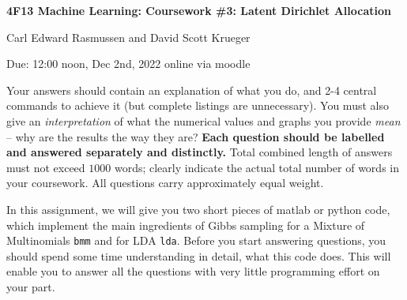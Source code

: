 \documentclass[11pt]{article}
\begin{document}
\centerline{\large\bf 4F13 Machine Learning: Coursework \#3: Latent
  Dirichlet Allocation}

\vspace{0.3cm}

\centerline{Carl Edward Rasmussen and David Scott Krueger} 

\vspace{0.2cm}

\centerline{Due: 12:00 noon, Dec 2nd, 2022 online via moodle}

\vspace{2mm}

Your answers should contain an explanation of what you do, and 2-4
central commands to achieve it (but complete listings are
unnecessary). You must also give an \emph{interpretation} of what the
numerical values and graphs you provide \emph{mean} -- why are the
results the way they are? {\bf Each question should be labelled and
  answered separately and distinctly.} Total combined length of
answers must not exceed $1000$ words; clearly indicate the actual total
number of words in your coursework. All questions carry approximately
equal weight.

In this assignment, we will give you two short pieces of matlab or python code,
which implement the main ingredients of Gibbs sampling for a Mixture
of Multinomials \texttt{bmm} and for LDA \texttt{lda}. Before you
start answering questions, you should spend some time understanding in
detail, what this code does. This will enable you to answer all the
questions with very little programming effort on your part.
\end{document}
